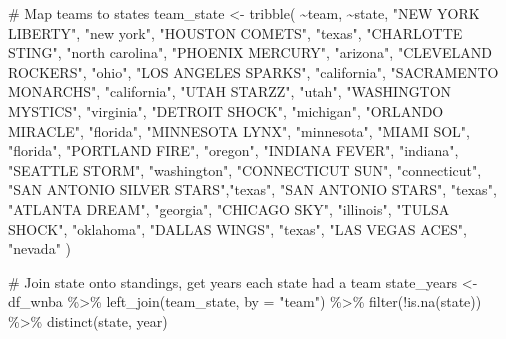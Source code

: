 \documentclass[
  letterpaper,
  DIV=11,
  numbers=noendperiod]{scrartcl}
\newenvironment{Shaded}{\begin{snugshade}}{\end{snugshade}}
\newcommand{\AttributeTok}[1]{\textcolor[rgb]{0.40,0.45,0.13}{#1}}
\newcommand{\CommentTok}[1]{\textcolor[rgb]{0.37,0.37,0.37}{#1}}
\newcommand{\FunctionTok}[1]{\textcolor[rgb]{0.28,0.35,0.67}{#1}}
\newcommand{\NormalTok}[1]{\textcolor[rgb]{0.00,0.23,0.31}{#1}}
\newcommand{\OtherTok}[1]{\textcolor[rgb]{0.00,0.23,0.31}{#1}}
\newcommand{\SpecialCharTok}[1]{\textcolor[rgb]{0.37,0.37,0.37}{#1}}
\newcommand{\StringTok}[1]{\textcolor[rgb]{0.13,0.47,0.30}{#1}}
\begin{document}
\begin{Shaded}
\begin{Highlighting}[]
\CommentTok{\# Map teams to states}
\NormalTok{team\_state }\OtherTok{\textless{}{-}} \FunctionTok{tribble}\NormalTok{(}
  \SpecialCharTok{\textasciitilde{}}\NormalTok{team,                    }\SpecialCharTok{\textasciitilde{}}\NormalTok{state,}
  \StringTok{"NEW YORK LIBERTY"}\NormalTok{,       }\StringTok{"new york"}\NormalTok{,}
  \StringTok{"HOUSTON COMETS"}\NormalTok{,         }\StringTok{"texas"}\NormalTok{,}
  \StringTok{"CHARLOTTE STING"}\NormalTok{,        }\StringTok{"north carolina"}\NormalTok{,}
  \StringTok{"PHOENIX MERCURY"}\NormalTok{,        }\StringTok{"arizona"}\NormalTok{,}
  \StringTok{"CLEVELAND ROCKERS"}\NormalTok{,      }\StringTok{"ohio"}\NormalTok{,}
  \StringTok{"LOS ANGELES SPARKS"}\NormalTok{,     }\StringTok{"california"}\NormalTok{,}
  \StringTok{"SACRAMENTO MONARCHS"}\NormalTok{,    }\StringTok{"california"}\NormalTok{,}
  \StringTok{"UTAH STARZZ"}\NormalTok{,            }\StringTok{"utah"}\NormalTok{,}
  \StringTok{"WASHINGTON MYSTICS"}\NormalTok{,     }\StringTok{"virginia"}\NormalTok{,}
  \StringTok{"DETROIT SHOCK"}\NormalTok{,          }\StringTok{"michigan"}\NormalTok{,}
  \StringTok{"ORLANDO MIRACLE"}\NormalTok{,        }\StringTok{"florida"}\NormalTok{,}
  \StringTok{"MINNESOTA LYNX"}\NormalTok{,         }\StringTok{"minnesota"}\NormalTok{,}
  \StringTok{"MIAMI SOL"}\NormalTok{,              }\StringTok{"florida"}\NormalTok{,}
  \StringTok{"PORTLAND FIRE"}\NormalTok{,          }\StringTok{"oregon"}\NormalTok{,}
  \StringTok{"INDIANA FEVER"}\NormalTok{,          }\StringTok{"indiana"}\NormalTok{,}
  \StringTok{"SEATTLE STORM"}\NormalTok{,          }\StringTok{"washington"}\NormalTok{,}
  \StringTok{"CONNECTICUT SUN"}\NormalTok{,        }\StringTok{"connecticut"}\NormalTok{,}
  \StringTok{"SAN ANTONIO SILVER STARS"}\NormalTok{,}\StringTok{"texas"}\NormalTok{,}
  \StringTok{"SAN ANTONIO STARS"}\NormalTok{,      }\StringTok{"texas"}\NormalTok{,}
  \StringTok{"ATLANTA DREAM"}\NormalTok{,          }\StringTok{"georgia"}\NormalTok{,}
  \StringTok{"CHICAGO SKY"}\NormalTok{,            }\StringTok{"illinois"}\NormalTok{,}
  \StringTok{"TULSA SHOCK"}\NormalTok{,            }\StringTok{"oklahoma"}\NormalTok{,}
  \StringTok{"DALLAS WINGS"}\NormalTok{,           }\StringTok{"texas"}\NormalTok{,}
  \StringTok{"LAS VEGAS ACES"}\NormalTok{,         }\StringTok{"nevada"}
\NormalTok{)}

\CommentTok{\# Join state onto standings, get years each state had a team}
\NormalTok{state\_years }\OtherTok{\textless{}{-}}\NormalTok{ df\_wnba }\SpecialCharTok{\%\textgreater{}\%}
  \FunctionTok{left\_join}\NormalTok{(team\_state, }\AttributeTok{by =} \StringTok{"team"}\NormalTok{) }\SpecialCharTok{\%\textgreater{}\%}
  \FunctionTok{filter}\NormalTok{(}\SpecialCharTok{!}\FunctionTok{is.na}\NormalTok{(state)) }\SpecialCharTok{\%\textgreater{}\%}
  \FunctionTok{distinct}\NormalTok{(state, year)}


\end{Highlighting}
\end{Shaded}
\end{document}
